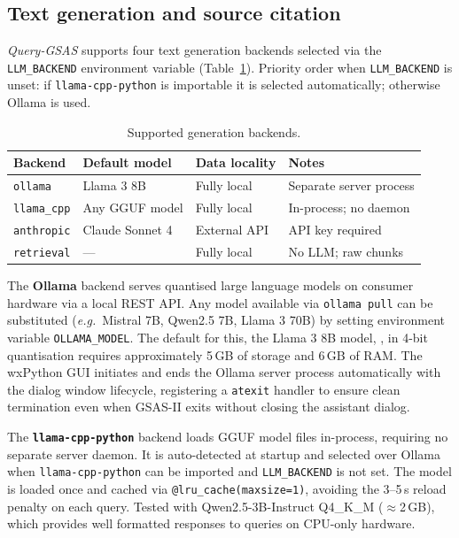 \subsection{Text generation and source citation}
\label{sec:inference}

\textit{Query-GSAS} supports four text generation backends selected via the
\texttt{LLM\_BACKEND} environment variable (Table~\ref{tab:backends}).
Priority order when \texttt{LLM\_BACKEND} is unset: if
\texttt{llama-cpp-python} is importable it is selected automatically;
otherwise Ollama is used.

\begin{table}[h]
  \centering
  \caption{Supported generation backends.}
  \label{tab:backends}
  \begin{tabular}{llll}
    \toprule
    Backend & Default model & Data locality & Notes \\
    \midrule
    \texttt{ollama}      & Llama 3 8B            & Fully local & Separate server process \\
    \texttt{llama\_cpp}  & Any GGUF model        & Fully local & In-process; no daemon \\
    \texttt{anthropic}   & Claude Sonnet 4       & External API & API key required \\
    \texttt{retrieval}   & ---                   & Fully local & No LLM; raw chunks \\
    \bottomrule
  \end{tabular}
\end{table}

The \textbf{Ollama} backend \citep{ollama2023} serves quantised large
language models on consumer hardware via a local REST API.
Any model available via \texttt{ollama pull} can be substituted
(\emph{e.g.}\ Mistral 7B, Qwen2.5 7B, Llama 3 70B) by setting environment variable 
\texttt{OLLAMA\_MODEL}.
The default for this, the Llama 3 8B model, \citep{meta2024llama3}, in 4-bit quantisation
requires approximately 5\,GB of storage and 6\,GB of RAM.
The wxPython GUI initiates and ends the Ollama server process
automatically with the dialog window lifecycle, registering a
\texttt{atexit} handler to ensure clean termination even when
GSAS-II exits without closing the assistant dialog.

The \textbf{\texttt{llama-cpp-python}} backend \citep{llamacpp2023}
loads GGUF model files in-process, requiring no separate server daemon.
It is auto-detected at startup and selected over Ollama when
\texttt{llama-cpp-python} can be imported and \texttt{LLM\_BACKEND}
is not set.
The model is loaded once and cached via
\texttt{@lru\_cache(maxsize=1)}, avoiding the 3--5\,s
reload penalty on each query.
Tested with Qwen2.5-3B-Instruct \citep{qwen2025} Q4\_K\_M
($\approx$2\,GB), which provides well formatted responses to queries on CPU-only hardware.

